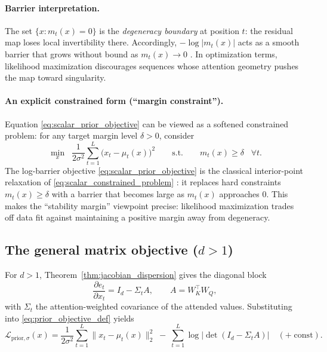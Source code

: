 \documentclass[11pt]{article}
\begin{document}
\paragraph{Barrier interpretation.}
The set $\{x : m_t(x)=0\}$ is the \emph{degeneracy boundary} at position $t$:
the residual map loses local invertibility there.
Accordingly, $-\log|m_t(x)|$ acts as a smooth barrier that grows without bound as $m_t(x)\to 0$
\citep{BoydVa04}.
In optimization terms, likelihood maximization discourages sequences whose attention geometry pushes
the map toward singularity.

\paragraph{An explicit constrained form (``margin constraint'').}
Equation \eqref{eq:scalar_prior_objective} can be viewed as a softened constrained problem:
for any target margin level $\delta>0$, consider
\begin{equation}
\min_x \;\;\frac{1}{2\sigma^2}\sum_{t=1}^L \big(x_t-\mu_t(x)\big)^2
\qquad\text{s.t.}\qquad
m_t(x)\ge \delta\;\;\;\forall t.
\label{eq:scalar_constrained_problem}
\end{equation}
The log-barrier objective \eqref{eq:scalar_prior_objective} is the classical interior-point relaxation
of \eqref{eq:scalar_constrained_problem} \citep{BoydVa04}:
it replaces hard constraints $m_t(x)\ge \delta$ with a barrier that becomes large as $m_t(x)$ approaches $0$.
This makes the ``stability margin'' viewpoint precise: likelihood maximization trades off data fit
against maintaining a positive margin away from degeneracy.

\subsection{The general matrix objective (\texorpdfstring{$d>1$}{d>1})}

For $d>1$, Theorem~\ref{thm:jacobian_dispersion} gives the diagonal block
\begin{equation}
\frac{\partial e_t}{\partial x_t} = I_d-\Sigma_t A,
\qquad
A=W_K^\top W_Q,
\label{eq:block_recall}
\end{equation}
with $\Sigma_t$ the attention-weighted covariance of the attended values.
Substituting into \eqref{eq:prior_objective_def} yields
\begin{equation}
\mathcal{L}_{\mathrm{prior},\sigma}(x)
=
\frac{1}{2\sigma^2}\sum_{t=1}^L \|x_t-\mu_t(x)\|_2^2
\;-\;
\sum_{t=1}^L \log\left|\det\!\left(I_d-\Sigma_t A\right)\right|
\quad (+\;\text{const}).
\label{eq:matrix_prior_objective}
\end{equation}
\end{document}
